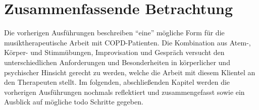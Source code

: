 \section{Zusammenfassende Betrachtung}
Die vorherigen Ausführungen beschreiben "`eine"' mögliche Form für die musiktherapeutische Arbeit mit COPD-Patienten. Die Kombination aus Atem-, Körper- und Stimmübungen, Improvisation und Gespräch versucht den unterschiedlichen Anforderungen und Besonderheiten in körperlicher und psychischer Hinsicht gerecht zu werden, welche die Arbeit mit diesem Klientel an den Therapeuten stellt. Im folgenden, abschließenden Kapitel werden die vorherigen Ausführungen nochmals reflektiert und zusammengefasst sowie ein Ausblick auf mögliche todo Schritte gegeben.




\ifpdf
    \graphicspath{{5_konzept/figures/PNG/}{5_konzept/figures/PDF/}{5_konzept/figures/}}
\else
    \graphicspath{{5_konzept/figures/EPS/}{5_konzept/figures/}}
\fi

\newpage\thispagestyle{empty}
